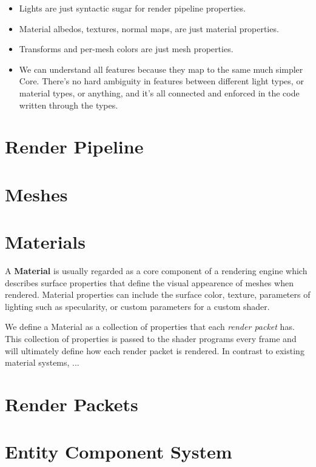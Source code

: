 \documentclass[a4paper,twoside,onecolumn,openright]{memoir}
\begin{document}
\begin{itemize}
    \item Lights are just syntactic sugar for render pipeline properties.
    \item Material albedos, textures, normal maps, are just material properties.
    \item Transforms and per-mesh colors are just mesh properties.
    \item We can understand all features because they map to the same much
        simpler Core. There's no hard ambiguity in features between different
        light types, or material types, or anything, and it's all connected and
        enforced in the code written through the types.
\end{itemize}



\section{Render Pipeline}

\section{Meshes}

\section{Materials}

A \textbf{Material} is usually regarded as a core component of a rendering
engine which describes surface properties that define the visual appearence of
meshes when rendered. Material properties can include the surface color,
texture, parameters of lighting such as specularity, or custom parameters for a
custom shader.

We define a Material as a collection of properties that each \emph{render
packet} has. This collection of properties is passed to the shader programs
every frame and will ultimately define how each render packet is rendered. In
contrast to existing material systems, ...

\section{Render Packets}


\section{Entity Component System\label{sec:ecs}}




\end{document}
